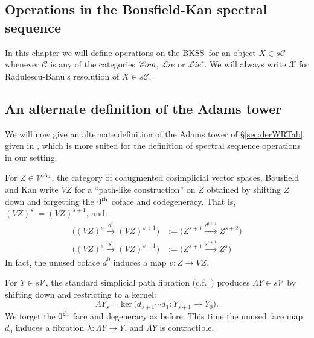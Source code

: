 \documentclass[11pt]{amsart} \renewcommand{\baselinestretch}{1.2}
\theoremstyle{plain}
\numberwithin{equation}{section} %
\theoremstyle{plain}
\numberwithin{equation}{chapter} %
\renewcommand{\ker}{\mathrm{ker}\,}
\renewcommand{\to}{\longrightarrow}
\newcommand{\scrL}{\mathscr{L}}
\newcommand{\scrC}{\mathscr{C}}
\newcommand{\calV}{\mathcal{V}}
\newcommand{\calw}{\mathcal{W}}
\newcommand{\calx}{\mathcal{X}}
\newcommand{\calc}{\mathcal{C}}
\newcommand{\citeBOX}[2][]{\cite[\mbox{#1}]{#2}}
\newcommand{\vect}[2]{\calV^{#1}_{#2}}
\newcommand{\HA}[1]{H#1}
\newcommand{\algs}{{\scrC\!\textit{\normalfont\textit{om}}}}
\newcommand{\liealgs}{{\scrL\!\textit{ie}}}
\newcommand{\restliealgs}{{\scrL\!\textit{ie}^\textit{r}}}
\newcommand{\algcat}{{\calc}}%
\newcommand{\BKSS}{BKSS}
\newcommand{\SectionOrChapter}[1]{\section{\textbf{#1}}}
\newcommand{\SubsectionOrSection}[1]{\subsection{#1}}
\begin{document}
\begin{Operations on the Bousfield-Kan spectral sequence}
\SectionOrChapter{Operations in the Bousfield-Kan spectral sequence}
\label{Operations on the Bousfield-Kan spectral sequence}
In this chapter
we will define operations on the \BKSS\ for an object $X\in s\calc$ whenever $\calc$ is any of the categories $\algs$, $\liealgs$ or $\restliealgs$. We will always write $\calx$ for Radulescu-Banu's resolution of $X\in s\algcat$. %


\SubsectionOrSection{An alternate definition of the Adams tower}
\label{An alternate definition of the Adams tower}
We will now give an alternate definition of the Adams tower of \S\ref{sec:derWRTab}, given in \cite{BK_pairings_products.pdf}, which is more suited for the definition of spectral sequence operations in our setting.

For $Z\in {\vect{}{}}^{\Delta_+}$, the category of coaugmented cosimplicial vector spaces, Bousfield and Kan write $VZ$ for a ``path-like construction'' \citeBOX[\S3.1]{BK_pairings_products.pdf} on $Z$ obtained by shifting $Z$ down and forgetting the $0^\textup{th}$ coface and codegeneracy. That is, $(VZ)^s:=(VZ)^{s+1}$, and:
\begin{align*}
\bigl((VZ)^s\overset{d^i}{\to} (VZ)^{s+1}\bigr)&:=\bigl(Z^{s+1}\overset{d^{i+1}}{\to} Z^{s+2}\bigr)\\
\bigl((VZ)^s\overset{s^i}{\to} (VZ)^{s-1}\bigr)&:=\bigl(Z^{s+1}\overset{s^{i+1}}{\to} Z^{s}\bigr)
\end{align*}
In fact, the unused coface $d^0$ induces a map $v:Z\to VZ$.

For $Y\in s\vect{}{}$, the standard simplicial path fibration (c.f.\ \citeBOX[p.~82]{BousKanSSeq.pdf}) produces $\Lambda Y\in s\vect{}{}$ by shifting down and restricting to a kernel:
\[\Lambda Y_s=\ker\bigl(d_{s+1}\cdots d_1:Y_{s+1}\to Y_0\bigr).\]
We forget the $0^\textup{th}$ face and degeneracy as before. This time the unused face map $d_0$ induces a fibration $\lambda:\Lambda Y\to Y$, and $\Lambda Y$ is  contractible.



\end{Operations on the Bousfield-Kan spectral sequence}
\end{document}
